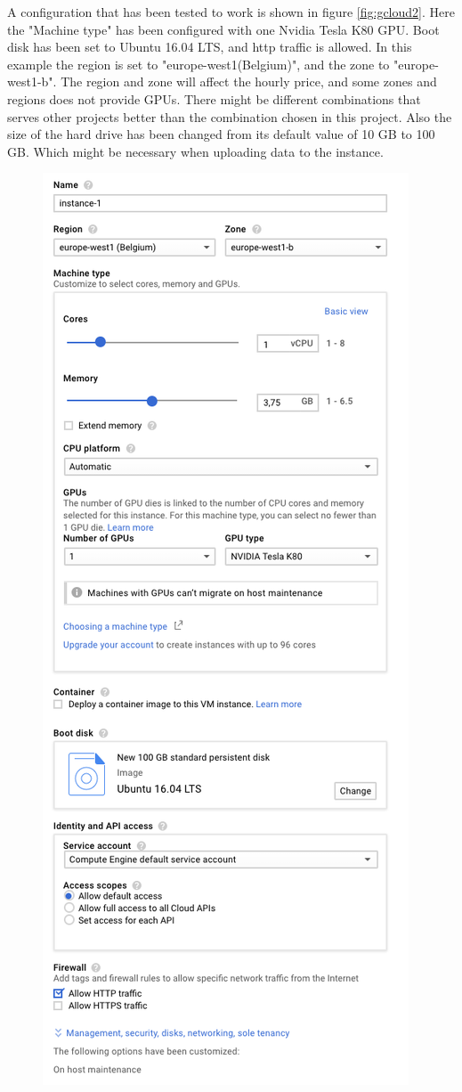 \newpage
\noindent
A configuration that has been tested to work is shown in figure \ref{fig:gcloud2}. Here the "Machine type" has been configured with one Nvidia Tesla K80 GPU. Boot disk has been set to Ubuntu 16.04 LTS, and http traffic is allowed. In this example the region is set to "europe-west1(Belgium)", and the zone to "europe-west1-b". The region and zone will affect the hourly price, and some zones and regions does not provide GPUs. There might be different combinations that serves other projects better than the combination chosen in this project. Also the size of the hard drive has been changed from its default value of 10 GB to 100 GB. Which might be necessary when uploading data to the instance. 

\begin{figure}
    \centering
    \includegraphics[scale=0.9]{images/gcloud_2.png}

\end{figure}
